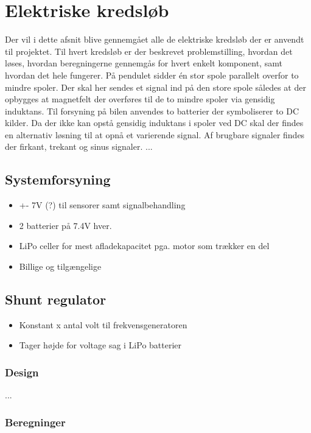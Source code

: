 
\section{Elektriske kredsløb}\label{sec:sec_sparningsreg}
Der vil i dette afsnit blive gennemgået alle de elektriske kredsløb der er anvendt til projektet. 
Til hvert kredsløb er der beskrevet problemstilling, hvordan det løses, hvordan beregningerne gennemgås for hvert enkelt komponent, samt hvordan det hele fungerer.
På pendulet sidder én stor spole parallelt overfor to mindre spoler. 
Der skal her sendes et signal ind på den store spole således at der opbygges at magnetfelt der overføres til de to mindre spoler via gensidig induktans. 
Til forsyning på bilen anvendes to batterier der symboliserer to DC kilder. 
Da der ikke kan opstå gensidig induktans i spoler ved DC skal der findes en alternativ løsning til at opnå et varierende signal. 
Af brugbare signaler findes der firkant, trekant og sinus signaler.
...
\subsection{Systemforsyning}
\begin{itemize}
	\item +- 7V (?) til sensorer samt signalbehandling
	\item 2 batterier på 7.4V hver. 
	\item LiPo celler for mest afladekapacitet pga. motor som trækker en del
	\item Billige og tilgængelige
\end{itemize}
\subsection{Shunt regulator}



\begin{itemize}
	\item Konstant x antal volt til frekvensgeneratoren
	\item Tager højde for voltage sag i LiPo batterier
\end{itemize}

	
	\subsubsection{Design}
	...
	
	\subsubsection{Beregninger}
	
